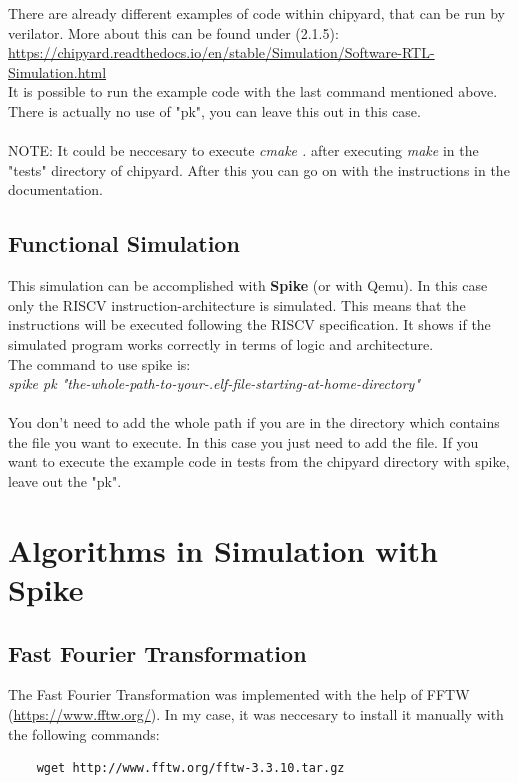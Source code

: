 \documentclass{article}
\begin{document}
{There are already different examples of code within chipyard, that can be run by verilator. More about this can be found under (2.1.5):\\
\url{https://chipyard.readthedocs.io/en/stable/Simulation/Software-RTL-Simulation.html}\\
It is possible to run the example code with the last command mentioned above. There is actually no use of "pk", you can leave this out in this case.\\\\
NOTE: It could be neccesary to execute \textit{cmake .} after executing \textit{make} in the "tests" directory of chipyard. After this you can go on with the instructions in the documentation.

\subsection*{Functional Simulation}
This simulation can be accomplished with \textbf{Spike} (or with Qemu). In this case only the 
RISCV instruction-architecture is simulated. This means that the instructions will be executed 
following the RISCV specification. It shows if the simulated program works correctly in terms 
of logic and architecture.\\
The command to use spike is:\\
\textit{spike pk "the-whole-path-to-your-.elf-file-starting-at-home-directory"}\\\\
You don't need to add the whole path if you are in the directory which contains the file you want to execute. In this case you just need to add the file.
If you want to execute the example code in tests from the chipyard directory with spike, leave out the "pk".


\section*{Algorithms in Simulation with Spike}
\subsection*{Fast Fourier Transformation}
The Fast Fourier Transformation was implemented with the help of FFTW (\url{https://www.fftw.org/}). In my case, it was neccesary to install it manually with the following commands:\\
\begin{verbatim}
    wget http://www.fftw.org/fftw-3.3.10.tar.gz


\end{verbatim}}
\end{document}
